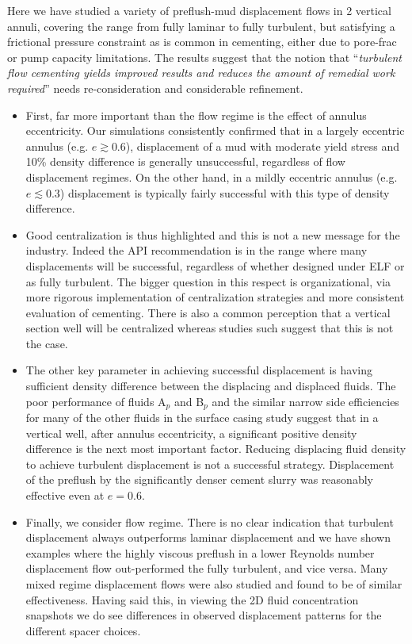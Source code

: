 \documentclass[review]{elsarticle}
\begin{document}
Here we have studied a variety of preflush-mud displacement flows in 2 vertical annuli, covering the range from fully laminar to fully turbulent, but satisfying a frictional pressure constraint as is common in cementing, either due to pore-frac or pump capacity limitations. The results suggest that the notion that ``\textit{turbulent flow cementing yields improved results and reduces the amount of remedial work required}''\citep{Brice1964} needs re-consideration and considerable refinement.
\begin{itemize}
    \item First, far more important than the flow regime is the effect of annulus eccentricity. Our simulations consistently confirmed that in a largely eccentric annulus (e.g. $e \gtrsim 0.6$), displacement of a mud with moderate yield stress and 10\% density difference is generally unsuccessful, regardless of flow displacement regimes. On the other hand, in a mildly eccentric annulus (e.g. $e \lesssim 0.3$) displacement is typically fairly successful with this type of density difference.
   \item Good centralization is thus highlighted and this is not a new message for the industry. Indeed the API recommendation is in the range where many displacements will be successful, regardless of whether designed under ELF or as fully turbulent. The bigger question in this respect is organizational, via more rigorous implementation of centralization strategies and more consistent evaluation of cementing. There is also a common perception that a vertical section well will be centralized whereas studies such \cite{Guillot2008,Gorokhova2014} suggest that this is not the case.
    \item The other key parameter in achieving successful displacement is having sufficient density difference between the displacing and displaced fluids. The poor performance of fluids A$_p$ and B$_p$ and the similar narrow side efficiencies for many of the other fluids in the surface casing study suggest that in a vertical well, after annulus eccentricity, a significant positive density difference is the next most important factor. Reducing displacing fluid density to achieve turbulent displacement is not a successful strategy. Displacement of the preflush by the significantly denser cement slurry was reasonably effective even at $e=0.6$.
    \item Finally, we consider flow regime. There is no clear indication that turbulent displacement always outperforms laminar displacement and we have shown examples where the highly viscous preflush in a lower Reynolds number displacement flow out-performed the fully turbulent, and vice versa. Many mixed regime displacement flows were also studied and found to be of similar effectiveness. Having said this, in viewing the 2D fluid concentration snapshots we do see differences in observed displacement patterns for the different spacer choices.
\end{itemize}
\end{document}
